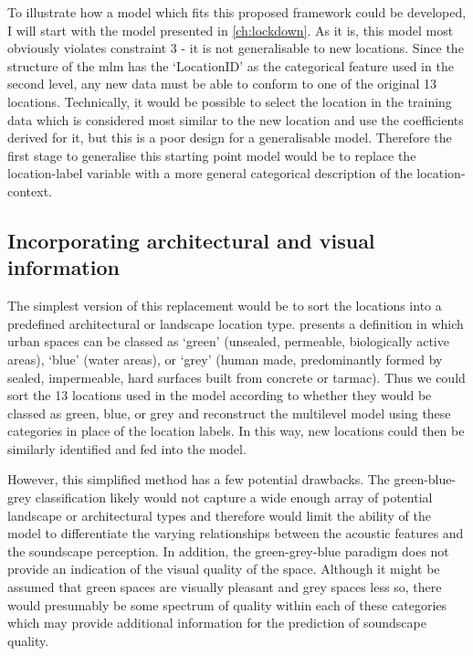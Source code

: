 To illustrate how a model which fits this proposed framework could be developed, I will start with the model presented in \cref{ch:lockdown}. As it is, this model most obviously violates constraint 3 - it is not generalisable to new locations. Since the structure of the \gls{mlm} has the `LocationID' as the categorical feature used in the second level, any new data must be able to conform to one of the original 13 locations. Technically, it would be possible to select the location in the training data which is considered most similar to the new location and use the coefficients derived for it, but this is a poor design for a generalisable model. Therefore the first stage to generalise this starting point model would be to replace the location-label variable with a more general categorical description of the location-context.

\subsection{Incorporating architectural and visual information}

The simplest version of this replacement would be to sort the locations into a predefined architectural or landscape location type. \citet{Suligowski2021Quantity} presents a definition in which urban spaces can be classed as `green' (unsealed, permeable, biologically active areas), `blue' (water areas), or `grey' (human made, predominantly formed by sealed, impermeable, hard surfaces built from concrete or tarmac). Thus we could sort the 13 locations used in the model according to whether they would be classed as green, blue, or grey and reconstruct the multilevel model using these categories in place of the location labels. In this way, new locations could then be similarly identified and fed into the model.

However, this simplified method has a few potential drawbacks. The green-blue-grey classification likely would not capture a wide enough array of potential landscape or architectural types and therefore would limit the ability of the model to differentiate the varying relationships between the acoustic features and the soundscape perception. In addition, the green-grey-blue paradigm does not provide an indication of the visual quality of the space. Although it might be assumed that green spaces are visually pleasant and grey spaces less so, there would presumably be some spectrum of quality within each of these categories which may provide additional information for the prediction of soundscape quality.

